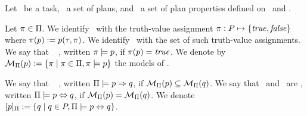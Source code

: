 

\begin{definition}
Let \task\ be a task, \plans\ a set of plans, and \props\ a set of
plan properties defined on \task\ and \plans.

Let $\pi \in \Pi$. We identify \plan\ with the truth-value
assignment $\pi : P \mapsto \{\mathit{true}, \mathit{false}\}$ where
$\pi(p) := p(\tau,\pi)$. We identify \plans\ with the set
of such truth-value assignments. We say that
\plan\  \prop, written $\pi \models p$, if
$\pi(p) = \mathit{true}$. We denote by ${\cal M}_{\Pi}(p) :=
\{\pi \mid \pi \in \Pi, \pi \models p\}$ the models of
\prop. 
%

We say that \prop\  \propq, written
$\Pi \models p \Rightarrow q$, if ${\cal M}_{\Pi}(p)
\subseteq {\cal M}_{\Pi}(q)$.
%
We say that \prop\ and \propq\ are ,
written $\Pi \models p \Leftrightarrow q$, if ${\cal M}_{\Pi}(p) =
{\cal M}_{\Pi}(q)$. We denote $[p]_{\Pi} :=
\{q \mid q \in P, \Pi \models p \Leftrightarrow q\}$.
\end{definition}

